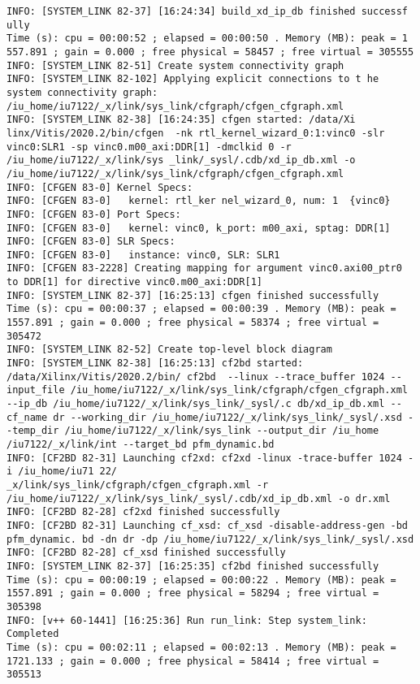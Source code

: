 \begin{lstlisting}[label=some-code-2,caption=Содержимое файла v++\_vinc.log]
INFO: [SYSTEM_LINK 82-37] [16:24:34] build_xd_ip_db finished successf ully
Time (s): cpu = 00:00:52 ; elapsed = 00:00:50 . Memory (MB): peak = 1 557.891 ; gain = 0.000 ; free physical = 58457 ; free virtual = 305555
INFO: [SYSTEM_LINK 82-51] Create system connectivity graph 
INFO: [SYSTEM_LINK 82-102] Applying explicit connections to t he system connectivity graph: /iu_home/iu7122/_x/link/sys_link/cfgraph/cfgen_cfgraph.xml
INFO: [SYSTEM_LINK 82-38] [16:24:35] cfgen started: /data/Xi linx/Vitis/2020.2/bin/cfgen  -nk rtl_kernel_wizard_0:1:vinc0 -slr vinc0:SLR1 -sp vinc0.m00_axi:DDR[1] -dmclkid 0 -r /iu_home/iu7122/_x/link/sys _link/_sysl/.cdb/xd_ip_db.xml -o /iu_home/iu7122/_x/link/sys_link/cfgraph/cfgen_cfgraph.xml
INFO: [CFGEN 83-0] Kernel Specs:  
INFO: [CFGEN 83-0]   kernel: rtl_ker nel_wizard_0, num: 1  {vinc0}
INFO: [CFGEN 83-0] Port Specs: 
INFO: [CFGEN 83-0]   kernel: vinc0, k_port: m00_axi, sptag: DDR[1]
INFO: [CFGEN 83-0] SLR Specs: 
INFO: [CFGEN 83-0]   instance: vinc0, SLR: SLR1
INFO: [CFGEN 83-2228] Creating mapping for argument vinc0.axi00_ptr0 to DDR[1] for directive vinc0.m00_axi:DDR[1]
INFO: [SYSTEM_LINK 82-37] [16:25:13] cfgen finished successfully
Time (s): cpu = 00:00:37 ; elapsed = 00:00:39 . Memory (MB): peak = 1557.891 ; gain = 0.000 ; free physical = 58374 ; free virtual = 305472
INFO: [SYSTEM_LINK 82-52] Create top-level block diagram
INFO: [SYSTEM_LINK 82-38] [16:25:13] cf2bd started: /data/Xilinx/Vitis/2020.2/bin/ cf2bd  --linux --trace_buffer 1024 --input_file /iu_home/iu7122/_x/link/sys_link/cfgraph/cfgen_cfgraph.xml --ip_db /iu_home/iu7122/_x/link/sys_link/_sysl/.c db/xd_ip_db.xml --cf_name dr --working_dir /iu_home/iu7122/_x/link/sys_link/_sysl/.xsd --temp_dir /iu_home/iu7122/_x/link/sys_link --output_dir /iu_home /iu7122/_x/link/int --target_bd pfm_dynamic.bd
INFO: [CF2BD 82-31] Launching cf2xd: cf2xd -linux -trace-buffer 1024 -i /iu_home/iu71 22/
_x/link/sys_link/cfgraph/cfgen_cfgraph.xml -r /iu_home/iu7122/_x/link/sys_link/_sysl/.cdb/xd_ip_db.xml -o dr.xml
INFO: [CF2BD 82-28] cf2xd finished successfully
INFO: [CF2BD 82-31] Launching cf_xsd: cf_xsd -disable-address-gen -bd pfm_dynamic. bd -dn dr -dp /iu_home/iu7122/_x/link/sys_link/_sysl/.xsd
INFO: [CF2BD 82-28] cf_xsd finished successfully
INFO: [SYSTEM_LINK 82-37] [16:25:35] cf2bd finished successfully
Time (s): cpu = 00:00:19 ; elapsed = 00:00:22 . Memory (MB): peak = 1557.891 ; gain = 0.000 ; free physical = 58294 ; free virtual = 305398
INFO: [v++ 60-1441] [16:25:36] Run run_link: Step system_link: Completed
Time (s): cpu = 00:02:11 ; elapsed = 00:02:13 . Memory (MB): peak = 1721.133 ; gain = 0.000 ; free physical = 58414 ; free virtual = 305513

\end{lstlisting}
